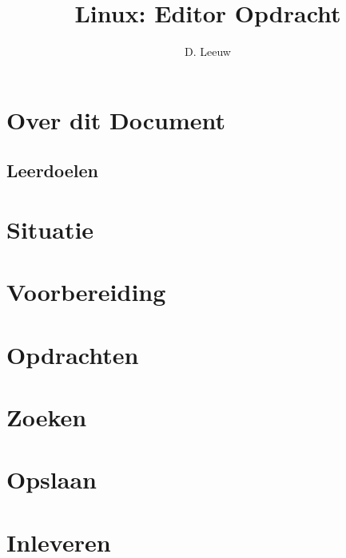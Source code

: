 \documentclass[a4paper,12pt,twoside,openright,titlepage]{article}
\author{D. Leeuw}
\title{Linux: Editor Opdracht}
\date{\today\\
\vfill
\raggedright
\copyright\ 2026 Dennis Leeuw\\
}
\begin{document}

\maketitle


\section{Over dit Document}
\subsection{Leerdoelen}




\section{Situatie}

\section{Voorbereiding}

\section{Opdrachten}

\section{Zoeken}

\section{Opslaan}

\section{Inleveren}


\printindex
\end{document}
